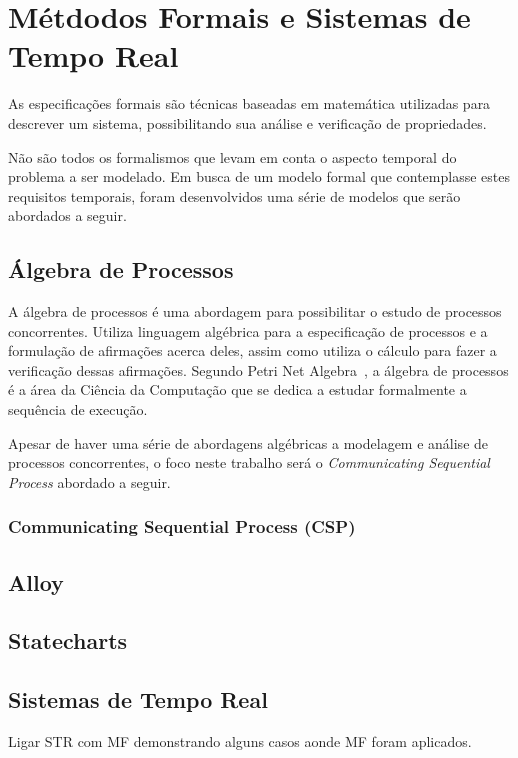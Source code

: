 \section{Métdodos Formais e Sistemas de Tempo Real}
As especificações formais são técnicas baseadas em matemática utilizadas para descrever um sistema,
possibilitando sua análise e verificação de propriedades.

Não são todos os formalismos que levam em conta o aspecto temporal do problema a ser modelado.
Em busca de um modelo formal que contemplasse estes requisitos temporais, foram desenvolvidos uma série
de modelos que serão abordados a seguir.

\subsection{Álgebra de Processos}
A álgebra de processos é uma abordagem para possibilitar o estudo de processos concorrentes. Utiliza linguagem algébrica
para a especificação de processos e a formulação de afirmações acerca deles, assim como utiliza o cálculo para fazer a
verificação dessas afirmações. Segundo Petri Net Algebra~\cite{books/daglib/0003970}, a álgebra de processos é a área da
Ciência da Computação que se dedica a estudar formalmente a sequência de execução.

Apesar de haver uma série de abordagens algébricas a modelagem e análise de processos concorrentes, o foco neste trabalho
será o \textit{Communicating Sequential Process} abordado a seguir.

\subsubsection{Communicating Sequential Process (CSP)}


\subsection{Alloy}


\subsection{Statecharts}


\subsection{Sistemas de Tempo Real}
Ligar STR com MF demonstrando alguns casos aonde MF foram aplicados.
